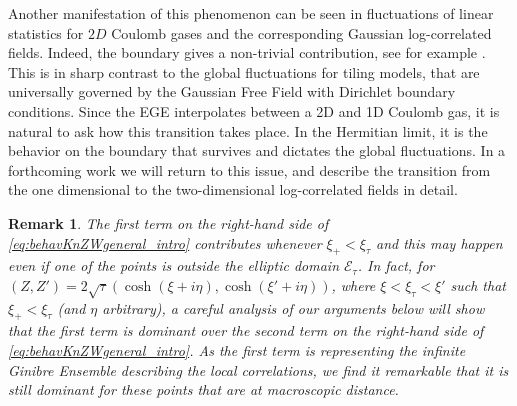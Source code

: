 \documentclass[%
 jmp,
cp,  %
 amsmath,amsthm,amssymb,%
 reprint,%
onecolumn]{revtex4-2}
\newtheorem{remark}[theorem]{Remark}
\begin{document}
Another manifestation of this phenomenon can be seen in fluctuations of linear statistics for $2D$ Coulomb gases and the corresponding Gaussian log-correlated fields. Indeed, the boundary gives a non-trivial contribution, see for example \cite{LeSy, AmHeMa,RiVi}. This is in sharp contrast to the global fluctuations for tiling models, that are universally governed by the Gaussian Free Field with  Dirichlet boundary conditions. Since the EGE  interpolates between a 2D and 1D Coulomb gas, it is natural to ask how this transition takes place.   In the Hermitian limit, it is the behavior on the boundary that survives and dictates the global fluctuations. In a forthcoming work we will  return to this issue, and describe the transition from the one dimensional to the two-dimensional log-correlated fields in detail. 

\begin{remark}
    The first term on the right-hand side of  \eqref{eq:behavKnZWgeneral_intro} contributes whenever $\xi_+<\xi_\tau$ and this may happen even if one of the points is outside the elliptic domain $\mathcal E_\tau$. In fact, for $(Z,Z') = 2\sqrt\tau (\cosh(\xi+i\eta),\cosh(\xi'+i\eta))$, where $\xi<\xi_\tau<\xi'$ such that $\xi_+<\xi_\tau$ (and $\eta$ arbitrary), a careful analysis of our arguments below will show that the first term is dominant over the second term on the right-hand side of \eqref{eq:behavKnZWgeneral_intro}. As the first term is representing the infinite Ginibre Ensemble describing the local correlations, we find it remarkable that it is still dominant for these points that are at macroscopic distance. %
 \end{remark}
\end{document}
